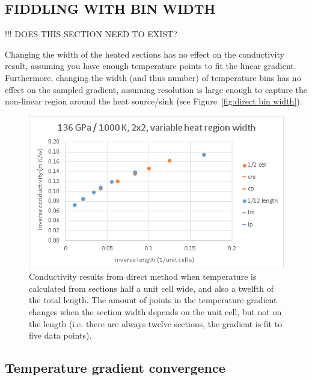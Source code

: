 \subsection{\label{sec:3.DM.bin}FIDDLING WITH BIN WIDTH}

!!! DOES THIS SECTION NEED TO EXIST?

Changing the width of the heated sections has no effect on the conductivity result, assuming you have enough temperature points to fit the linear gradient. Furthermore, changing the width (and thus number) of temperature bins has no effect on the sampled gradient, assuming resolution is large enough to capture the non-linear region around the heat source/sink (see Figure~\ref{fig:direct bin width}). 

\begin{figure}[h!]
\includegraphics[width=\linewidth]{Figures/direct_bin_width.png}
\caption[direct bin width]{Conductivity results from direct method when temperature is calculated from sections half a unit cell wide, and also a twelfth of the total length. The amount of points in the temperature gradient changes when the section width depends on the unit cell, but not on the length (i.e. there are always twelve sections, the gradient is fit to five data points).}
\label{fig:direct_bin_width}
\end{figure}


\subsection{\label{sec:3.DM.grad}Temperature gradient convergence}

